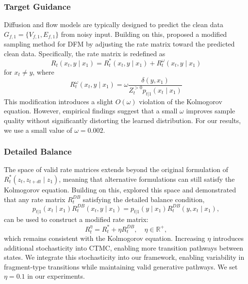 \subsubsection{Target Guidance}
\label{appsubsubsec:target_guidance}

Diffusion and flow models are typically designed to predict the clean data $G_{f,1} = \{V_{f,1}, E_{f,1}\}$ from noisy input. 
Building on this, \citep{defog} proposed a modified sampling method for DFM by adjusting the rate matrix toward the predicted clean data. 
Specifically, the rate matrix is redefined as 
\begin{equation}
    R_t(x_t, y \mid x_1) = R^*_t(x_t, y \mid x_1) + R^\omega_t(x_t, y \mid x_1)
    \label{eq:target_guidance_rate_matrix_adjustment}
\end{equation}
for $x_t \neq y$, where
\begin{equation}
    R^\omega_t(x_t, y \mid x_1) 
    = \omega \frac{\delta(y, x_1)}{Z^{>0}_t p_{t|1}(x_t \mid x_1)}
    \label{eq:define_target_guidance}
\end{equation}
This modification introduces a slight $O(\omega)$ violation of the Kolmogorov equation. 
However, empirical findings suggest that a small $\omega$ improves sample quality without significantly distorting the learned distribution. 
For our results, we use a small value of $\omega=0.002$.


\subsubsection{Detailed Balance}
\label{appsubsubsec:detailed_balance}

The space of valid rate matrices extends beyond the original formulation of  $R^*_{t}(z_t, z_{t+dt} \mid z_1)$, meaning that alternative formulations can still satisfy the Kolmogorov equation.
Building on this, \citet{dfm_1} explored this space and demonstrated that any rate matrix  $R^{DB}_t$  satisfying the detailed balance condition,
\begin{equation}
    p_{t|1}(x_t \mid x_1) R^{DB}_t(x_t, y \mid x_1) 
    = p_{t|1}(y \mid x_1) R^{DB}_t(y, x_t \mid x_1),
    \label{eq:detailed_balance}
\end{equation}
can be used to construct a modified rate matrix:
\begin{equation}
    R^\eta_t = R^*_t + \eta R^{DB}_t, \quad \eta \in \mathbb{R}^+,
    \label{eq:stochastic_rate_matrix}
\end{equation}
which remains consistent with the Kolmogorov equation. 
Increasing $\eta$ introduces additional stochasticity into CTMC, enabling more transition pathways between states. 
We integrate this stochasticity into our \methodname{} framework, enabling variability in fragment-type transitions while maintaining valid generative pathways. 
We set  $\eta = 0.1$ in our experiments.


